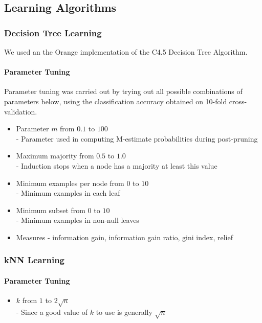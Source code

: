 \documentclass[11pt,letter]{article}
\begin{document}
\subsection{Learning Algorithms}

\subsubsection{Decision Tree Learning}

We used an the Orange implementation of the C4.5 Decision Tree Algorithm.

\paragraph{Parameter Tuning}
Parameter tuning was carried out by trying out all possible combinations of parameters below, using the classification accuracy obtained on 10-fold cross-validation.

\begin{itemize}
	\item Parameter $m$ from $0.1$ to $100$ \\
		- Parameter used in computing M-estimate probabilities during post-pruning
	\item Maximum majority from $0.5$ to $1.0$ \\
		- Induction stops when a node has a majority at least this value
	\item Minimum examples per node from $0$ to $10$ \\
		- Minimum examples in each leaf
	\item Minimum subset from $0$ to $10$ \\
		- Minimum examples in non-null leaves
	\item Measures - information gain, information gain ratio, gini index, relief %
\end{itemize}

\subsubsection{kNN Learning}

\paragraph{Parameter Tuning}
\begin{itemize}
	\item $k$ from $1$ to $2\sqrt{n}$ \\
		- Since a good value of $k$ to use is generally $\sqrt{n}$
\end{itemize}
\end{document}
